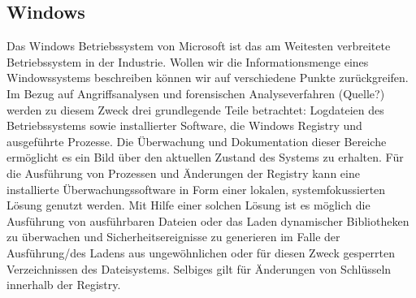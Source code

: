\subsection{Windows}
Das Windows Betriebssystem von Microsoft ist das am Weitesten verbreitete Betriebssystem in der Industrie. Wollen wir die Informationsmenge eines Windowssystems beschreiben können wir auf verschiedene Punkte zurückgreifen. Im Bezug auf Angriffsanalysen und forensischen Analyseverfahren (Quelle?) werden zu diesem Zweck drei grundlegende Teile betrachtet: Logdateien des Betriebssystems sowie installierter Software, die Windows Registry und ausgeführte Prozesse. Die Überwachung und Dokumentation dieser Bereiche ermöglicht es ein Bild über den aktuellen Zustand des Systems zu erhalten. 
Für die Ausführung von Prozessen und Änderungen der Registry kann eine installierte Überwachungssoftware in Form einer lokalen, systemfokussierten Lösung genutzt werden. Mit Hilfe einer solchen Lösung ist es möglich die Ausführung von ausführbaren Dateien oder das Laden dynamischer Bibliotheken zu überwachen und Sicherheitsereignisse zu generieren im Falle der Ausführung/des Ladens aus ungewöhnlichen oder für diesen Zweck gesperrten Verzeichnissen des Dateisystems. Selbiges gilt für Änderungen von Schlüsseln innerhalb der Registry. 

